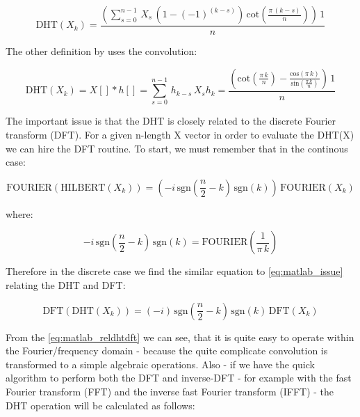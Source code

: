 \documentclass[12pt,twoside,a4paper]{article}
\numberwithin{equation}{subsection}
\numberwithin{figure}{subsection}
\begin{document}
\begin{equation} \label{eq:matlab_fhttheroy}
  \mathrm{DHT}({X_{k}})=\frac { \left(  \! \sum_{s=0}^{n - 1}\,{X _{s}}\,(1 - ( - 1)^{(k - s)})\,\mathrm{cot}(\frac {\pi \,(k - s)
}{n}) \!  \right) \,1}{n}
\end{equation}

The other definition by \cite{calvetti_computation} uses the convolution:

\begin{subequations} \label{eq:matlab_convolution}
  \begin{equation}   \label{eq:mconv_dht}
    \mathrm{DHT}({X_{k}})  = X[] * h[] = \sum_{s=0}^{n - 1}\,{h_{k - s}}\,{X_{s}}
  \end{equation}
  \begin{equation}   \label{eq:mconv_hk}
    {h_{k}}=\frac { \left(  \! \mathrm{cot}(\frac {\pi \,k}{n}) - \frac {\mathrm{cos}(\pi \,k)}{\mathrm{sin}(\frac {\pi \,k}{n})}\!
      \right) \,1}{n}
  \end{equation}
\end{subequations}

The important issue is that the DHT is closely related to the discrete Fourier transform (DFT). For a given n-length X vector in
order to evaluate the DHT(X) we can hire the DFT routine. To start, we must remember that in the continous case:

\begin{equation} \label{eq:matlab_issue}
  \mathrm{FOURIER}(\mathrm{HILBERT}({X_{k}}))=( - i\,\mathrm{sgn}( \frac {n}{2} - k)\,\mathrm{sgn}(k))\,\mathrm{FOURIER}({X_{k}})
\end{equation}

where:

\begin{equation} \label{eq:matlab_kernel}
   - i\,\mathrm{sgn}(\frac {n}{2} - k)\,\mathrm{sgn}(k)=\mathrm{FOURIER}(\frac {1}{\pi \,k})
\end{equation}

Therefore in the discrete case we find the similar equation to \ref{eq:matlab_issue} relating the DHT and DFT:

\begin{equation} \label{eq:matlab_reldhtdft}
  \mathrm{DFT}(\mathrm{DHT}({X_{k}}))=( - i)\,\mathrm{sgn}(\frac {n}{2} - k)\,\mathrm{sgn}(k)\,\mathrm{DFT}({X_{k}})
\end{equation}

From the \ref{eq:matlab_reldhtdft} we can see, that it is quite easy to operate within the Fourier/frequency domain - because the
quite complicate convolution is transformed to a simple algebraic operations. Also - if we have the quick algorithm to perform both
the DFT and inverse-DFT - for example with the fast Fourier transform (FFT) and the inverse fast Fourier transform (IFFT) - the DHT
operation will be calculated as follows:
\end{document}
